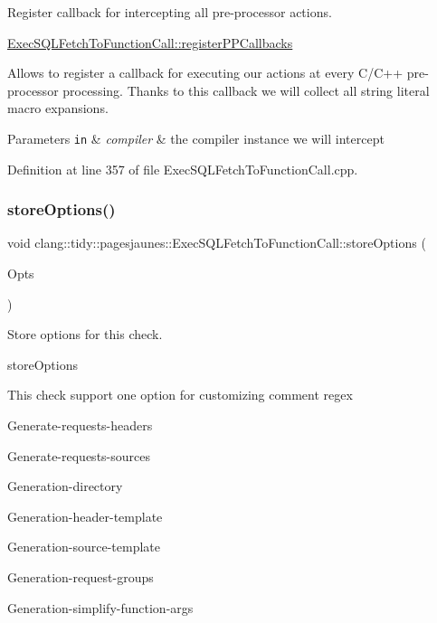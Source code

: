 Register callback for intercepting all pre-\/processor actions. 

\hyperlink{classclang_1_1tidy_1_1pagesjaunes_1_1_exec_s_q_l_fetch_to_function_call_af6724b81cf61f7a0d3c2289c1a6cbc8e}{Exec\+S\+Q\+L\+Fetch\+To\+Function\+Call\+::register\+P\+P\+Callbacks}

Allows to register a callback for executing our actions at every C/\+C++ pre-\/processor processing. Thanks to this callback we will collect all string literal macro expansions.


\begin{DoxyParams}[1]{Parameters}
\mbox{\tt in}  & {\em compiler} & the compiler instance we will intercept \\
\hline
\end{DoxyParams}


Definition at line 357 of file Exec\+S\+Q\+L\+Fetch\+To\+Function\+Call.\+cpp.

\mbox{\label{classclang_1_1tidy_1_1pagesjaunes_1_1_exec_s_q_l_fetch_to_function_call_a9bee983a32665e3c0b6e983d05ea9786}} 
\subsubsection{\texorpdfstring{store\+Options()}{storeOptions()}}
{\footnotesize\ttfamily void clang\+::tidy\+::pagesjaunes\+::\+Exec\+S\+Q\+L\+Fetch\+To\+Function\+Call\+::store\+Options (\begin{DoxyParamCaption}\item[{Clang\+Tidy\+Options\+::\+Option\+Map \&}]{Opts }\end{DoxyParamCaption})\hspace{0.3cm}{\ttfamily [override]}}



Store options for this check. 

store\+Options

This check support one option for customizing comment regex
\begin{DoxyItemize}
\item Generate-\/requests-\/headers
\item Generate-\/requests-\/sources
\item Generation-\/directory
\item Generation-\/header-\/template
\item Generation-\/source-\/template
\item Generation-\/request-\/groups
\item Generation-\/simplify-\/function-\/args
\end{DoxyItemize}


